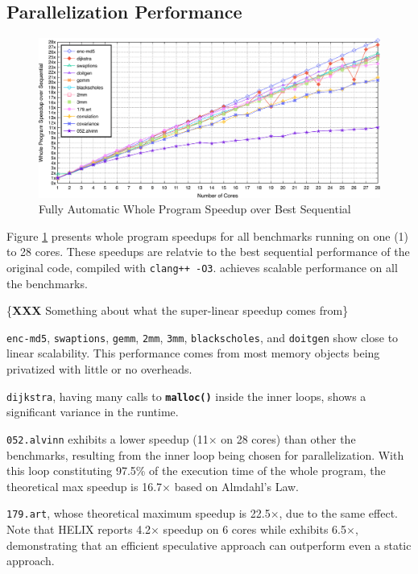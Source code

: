 \subsection{Parallelization Performance}

\begin{figure}[ht]
  \includegraphics[width=\textwidth]{figures/multi-core-crop}
  \caption{Fully Automatic Whole Program Speedup over Best Sequential}
  \label{fig:multi-core-scale}
\end{figure}

Figure \ref{fig:multi-core-scale} presents whole program speedups for
all benchmarks running on one (1) to 28 cores. These speedups are
relatvie to the best sequential performance of the original code, compiled
with \texttt{clang++ -O3}. \name achieves scalable performance on all the
benchmarks.

\{\textbf{XXX} Something about what the super-linear speedup comes from\}

\texttt{enc-md5}, \texttt{swaptions}, \texttt{gemm}, \texttt{2mm},
\texttt{3mm}, \texttt{blackscholes}, and \texttt{doitgen} show
close to linear scalability. This performance comes from most memory
objects being privatized with little or no overheads.

\texttt{dijkstra}, having many calls to \texttt{\textbf{malloc()}}
inside the inner loops, shows a significant variance in
the runtime.

\texttt{052.alvinn} exhibits a lower speedup (11$\times$ on 28
cores) than other the benchmarks, resulting from the inner loop
being chosen for parallelization. With this loop constituting 97.5\% of the
execution time of the whole program, the theoretical max speedup is 16.7$\times$
based on Almdahl's Law.

\texttt{179.art}, whose theoretical maximum speedup is 22.5$\times$, due to
the same effect. Note that HELIX\cite{simone:12:cgo} reports 4.2$\times$ speedup
on 6 cores while \name exhibits 6.5$\times$, demonstrating that an efficient
speculative approach can outperform even a static approach.

